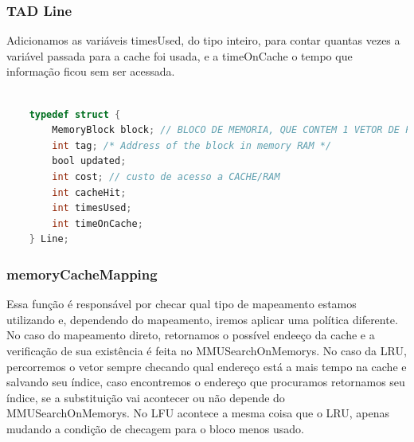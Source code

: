 \documentclass{article}
\begin{document}
\subsubsection{TAD Line}

Adicionamos as variáveis timesUsed, do tipo inteiro, para contar quantas vezes a variável passada para a cache foi usada, e a timeOnCache o tempo que informação ficou sem ser acessada.

\begin{lstlisting}[caption={TAD Line},label={lst:cod6},language=C]

    typedef struct {
        MemoryBlock block; // BLOCO DE MEMORIA, QUE CONTEM 1 VETOR DE PALAVRAS, O BLOCO REPRESENTA CACHE L1 L2 L3 E RAM
        int tag; /* Address of the block in memory RAM */
        bool updated;
        int cost; // custo de acesso a CACHE/RAM
        int cacheHit;
        int timesUsed;
        int timeOnCache;
    } Line;

\end{lstlisting}

\subsubsection{memoryCacheMapping}

Essa função é responsável por checar qual tipo de mapeamento estamos utilizando e, dependendo do mapeamento,
iremos aplicar uma política diferente. No caso do mapeamento direto, retornamos o possível endeeço da cache e a verificação
de sua existência é feita no MMUSearchOnMemorys. No caso da LRU, percorremos o vetor sempre checando qual endereço está a mais tempo na cache
e salvando seu índice, caso encontremos o endereço que procuramos retornamos seu índice, se a substituição vai acontecer ou não depende do MMUSearchOnMemorys.
No LFU acontece a mesma coisa que o LRU, apenas mudando a condição de checagem para o bloco menos usado.
\end{document}
